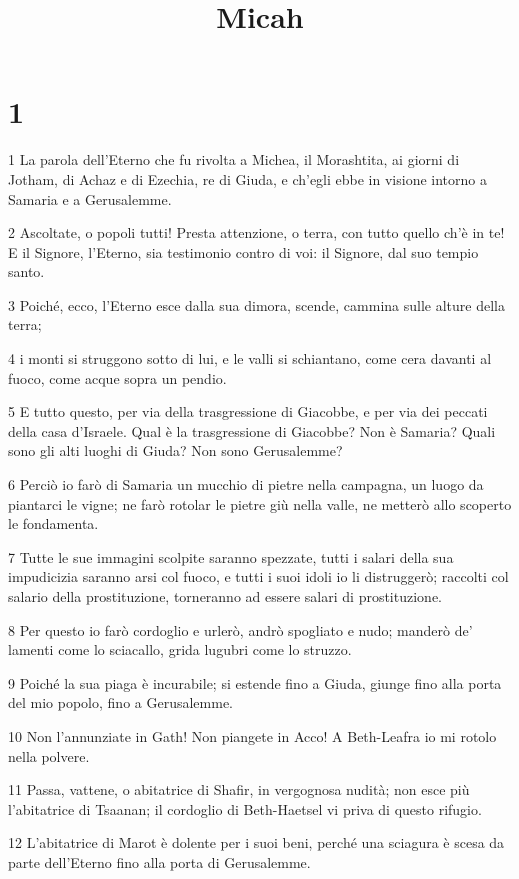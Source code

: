 

\title{Micah}


\chapter{1}

\par 1 La parola dell'Eterno che fu rivolta a Michea, il Morashtita, ai giorni di Jotham, di Achaz e di Ezechia, re di Giuda, e ch'egli ebbe in visione intorno a Samaria e a Gerusalemme.
\par 2 Ascoltate, o popoli tutti! Presta attenzione, o terra, con tutto quello ch'è in te! E il Signore, l'Eterno, sia testimonio contro di voi: il Signore, dal suo tempio santo.
\par 3 Poiché, ecco, l'Eterno esce dalla sua dimora, scende, cammina sulle alture della terra;
\par 4 i monti si struggono sotto di lui, e le valli si schiantano, come cera davanti al fuoco, come acque sopra un pendio.
\par 5 E tutto questo, per via della trasgressione di Giacobbe, e per via dei peccati della casa d'Israele. Qual è la trasgressione di Giacobbe? Non è Samaria? Quali sono gli alti luoghi di Giuda? Non sono Gerusalemme?
\par 6 Perciò io farò di Samaria un mucchio di pietre nella campagna, un luogo da piantarci le vigne; ne farò rotolar le pietre giù nella valle, ne metterò allo scoperto le fondamenta.
\par 7 Tutte le sue immagini scolpite saranno spezzate, tutti i salari della sua impudicizia saranno arsi col fuoco, e tutti i suoi idoli io li distruggerò; raccolti col salario della prostituzione, torneranno ad essere salari di prostituzione.
\par 8 Per questo io farò cordoglio e urlerò, andrò spogliato e nudo; manderò de' lamenti come lo sciacallo, grida lugubri come lo struzzo.
\par 9 Poiché la sua piaga è incurabile; si estende fino a Giuda, giunge fino alla porta del mio popolo, fino a Gerusalemme.
\par 10 Non l'annunziate in Gath! Non piangete in Acco! A Beth-Leafra io mi rotolo nella polvere.
\par 11 Passa, vattene, o abitatrice di Shafir, in vergognosa nudità; non esce più l'abitatrice di Tsaanan; il cordoglio di Beth-Haetsel vi priva di questo rifugio.
\par 12 L'abitatrice di Marot è dolente per i suoi beni, perché una sciagura è scesa da parte dell'Eterno fino alla porta di Gerusalemme.
